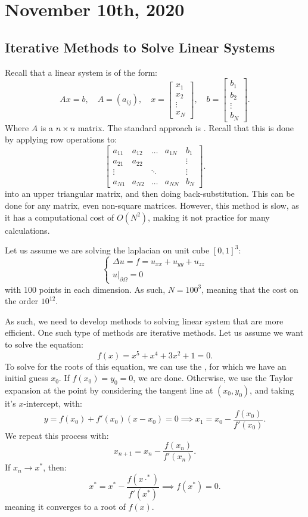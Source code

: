 \documentclass[../main/main.tex]{subfiles}
\begin{document}
\section{November 10th, 2020}
\subsection{Iterative Methods to Solve Linear Systems}
Recall that a linear system is of the form: \[
    Ax = b, \quad A = (a_{ij}), \quad x = \begin{bmatrix} x_1 \\ x_2 \\ \vdots \\x_N \end{bmatrix} , \quad b = \begin{bmatrix}  b_1 \\ b_2 \\ \vdots \\ b_N \end{bmatrix} 
.\] Where $A$ is a  $n \times  n$ matrix. The standard approach is . 
Recall that this is done by applying row operations to: \[
    \begin{bmatrix} a_{11} & a_{12} & \ldots & a_{1N} & b_1 \\
    a_{21} & a_{22} & & & \vdots \\
    \vdots &  &\ddots & & \vdots \\
    a_{N1} & a_{N2} &\ldots &a_{NN} & b_N
\end{bmatrix} 
.\]
into an upper triangular matrix, and then doing back-substitution. This can be done for any matrix, even non-square matrices. However, this method is slow, as it has a computational cost of $O(N^2)$, making it not practice for many calculations.
\begin{example}
    Let us assume we are solving the laplacian on unit cube $[0,1]^{3}$: \[
    \begin{cases}
        \Delta u = f = u_{x x } + u_{ y y} + u_{z z} \\
    u\big\rvert_{\partial \Omega} = 0
    \end{cases}
    \] with 100 points in each dimension. As such,  $N = 100^3$, meaning that the cost on the order $10^{12}$.
\end{example}
As such, we need to develop methods to solving linear system that are more efficient. One such type of methods are iterative methods. Let us assume we want to solve the equation: \[
    f(x) = x^5 + x^4 + 3x^2 + 1 = 0
.\] To solve for the roots of this equation, we can use the , for which we have an initial guess  $x_0$. If  $f(x_0)=y_0 =0$, we are done. Otherwise, we use the Taylor expansion at the point by considering the tangent line at  $ (x_0,y_0)$, and taking it's $x$-intercept, with: \[
y = f(x_0) + f'(x_0) (x-x_0) = 0 \implies x_1 = x_0 - \frac{f(x_0)}{f'(x_0)}
.\] We repeat this process with: \[
x_{n+1} = x_n - \frac{f(x_n)}{f'(x_n)}
.\] If $x_n \to  x^*$, then: \[
x^* = x^* - \frac{f(x\cdot^*)}{f'(x^*)} \implies f(x^*) = 0
.\] meaning it converges to a root of $f(x)$.
\end{document}
